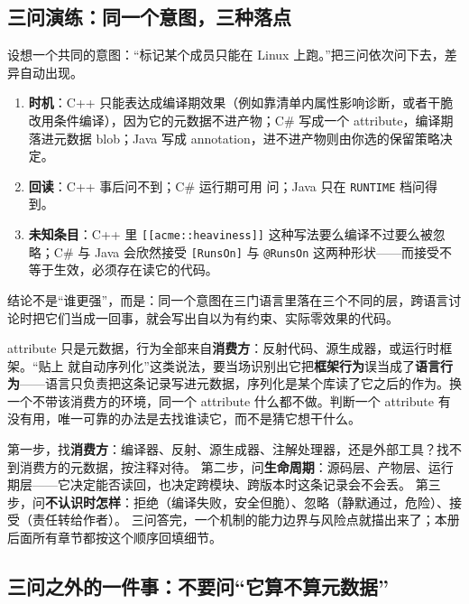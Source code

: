 \documentclass[12pt,a4paper,fontset=fandol]{ctexbook}
\newcommand{\cpp}[1]{C++#1}
\newcommand{\seqkw}[1]{\seqsplit{\texttt{#1}}}
\begin{document}
\subsection*{三问演练：同一个意图，三种落点}

设想一个共同的意图：“标记某个成员只能在 Linux 上跑。”把三问依次问下去，差异自动出现。
\begin{enumerate}
\item \textbf{时机}：\cpp{} 只能表达成编译期效果（例如靠清单内属性影响诊断，或者干脆改用条件编译），因为它的元数据不进产物；C\# 写成一个 attribute，编译期落进元数据 blob；Java 写成 annotation，进不进产物则由你选的保留策略决定。
\item \textbf{回读}：\cpp{} 事后问不到；C\# 运行期可用 \seqkw{GetCustomAttributes} 问；Java 只在 \texttt{RUNTIME} 档问得到。
\item \textbf{未知条目}：\cpp{} 里 \texttt{[[acme::heaviness]]} 这种写法要么编译不过要么被忽略；C\# 与 Java 会欣然接受 \texttt{[RunsOn]} 与 \texttt{@RunsOn} 这两种形状——而接受不等于生效，必须存在读它的代码。
\end{enumerate}
结论不是“谁更强”，而是：同一个意图在三门语言里落在三个不同的层，跨语言讨论时把它们当成一回事，就会写出自以为有约束、实际零效果的代码。

\begin{warning}[title={C\# 的 attribute 不会自己做事}]
attribute 只是元数据，行为全部来自\textbf{消费方}：反射代码、源生成器，或运行时框架。“贴上 \seqkw{[Serializable]} 就自动序列化”这类说法，要当场识别出它把\textbf{框架行为}误当成了\textbf{语言行为}——语言只负责把这条记录写进元数据，序列化是某个库读了它之后的作为。换一个不带该消费方的环境，同一个 attribute 什么都不做。判断一个 attribute 有没有用，唯一可靠的办法是去找谁读它，而不是猜它想干什么。
\end{warning}

\begin{bestpractice}[title={遇到任何元数据设施的三步读法}]
第一步，找\textbf{消费方}：编译器、反射、源生成器、注解处理器，还是外部工具？找不到消费方的元数据，按注释对待。
第二步，问\textbf{生命周期}：源码层、产物层、运行期层——它决定能否读回，也决定跨模块、跨版本时这条记录会不会丢。
第三步，问\textbf{不认识时怎样}：拒绝（编译失败，安全但脆）、忽略（静默通过，危险）、接受（责任转给作者）。
三问答完，一个机制的能力边界与风险点就描出来了；本册后面所有章节都按这个顺序回填细节。
\end{bestpractice}

\subsection*{三问之外的一件事：不要问“它算不算元数据”}
\end{document}

